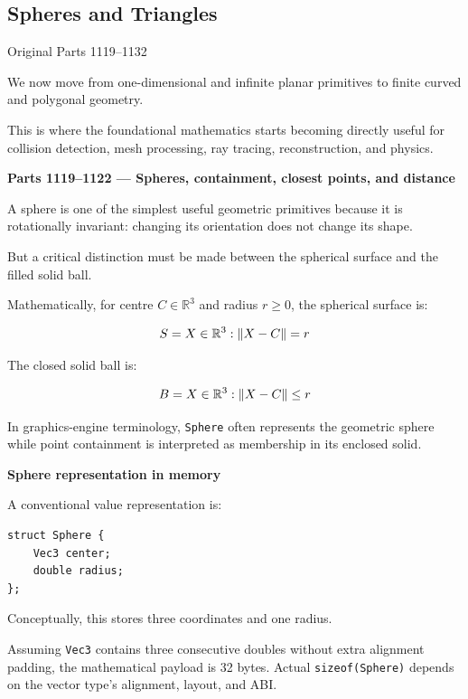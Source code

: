 \subsection{Spheres and Triangles}\label{03-visual-computing-i-ch020-spheres-and-triangles}

\hypertarget{03-visual-computing-i-ch020-spheres-and-triangles}{}

Original Parts 1119--1132

We now move from one-dimensional and infinite planar primitives to finite curved and polygonal geometry.

This is where the foundational mathematics starts becoming directly useful for collision detection, mesh processing, ray tracing, reconstruction, and physics.

\textbf{Parts 1119--1122 --- Spheres, containment, closest points, and distance}

A sphere is one of the simplest useful geometric primitives because it is rotationally invariant: changing its orientation does not change its shape.

But a critical distinction must be made between the spherical surface and the filled solid ball.

Mathematically, for centre \(C\in\mathbb R^3\) and radius \(r\ge0\), the spherical surface is:

\[
S=\\{X\in\mathbb R^3:\|X-C\|=r\\}
\]

The closed solid ball is:

\[
B=\\{X\in\mathbb R^3:\|X-C\|\le r\\}
\]

In graphics-engine terminology, \texttt{Sphere} often represents the geometric sphere while point containment is interpreted as membership in its enclosed solid.

\textbf{Sphere representation in memory}

A conventional value representation is:

\begin{verbatim}
struct Sphere {
    Vec3 center;
    double radius;
};
\end{verbatim}

Conceptually, this stores three coordinates and one radius.

Assuming \texttt{Vec3} contains three consecutive doubles without extra alignment padding, the mathematical payload is 32 bytes. Actual \texttt{sizeof(Sphere)} depends on the vector type's alignment, layout, and ABI.

